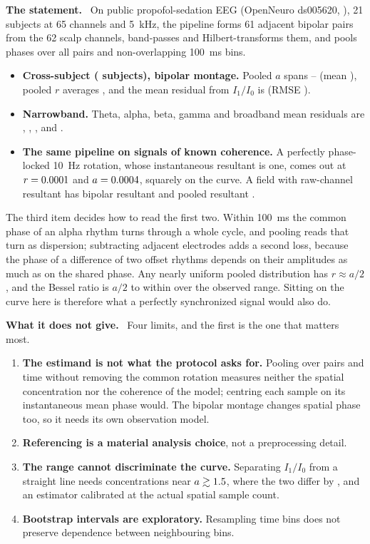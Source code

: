 \documentclass[11pt]{article}
\newcommand{\statement}{\par\smallskip\noindent\textbf{The statement.}\ }
\newcommand{\scope}{\par\smallskip\noindent\textbf{What it does not give.}\ }
\begin{document}
\statement
On public propofol-sedation EEG (OpenNeuro ds005620, \citealp{bajwa2025}),
21 subjects at 65 channels and 5~kHz, the pipeline forms 61 adjacent bipolar
pairs from the 62 scalp channels, band-passes and Hilbert-transforms them, and
pools phases over all pairs and non-overlapping 100~ms bins.

\begin{itemize}[leftmargin=*]
\item \textbf{Cross-subject (\eegCrossSubjectCount{} subjects), bipolar montage.}
Pooled $a$ spans \eegAMin--\eegAMax{} (mean \eegAMean), pooled $r$ averages
\eegRMean, and the mean residual from $I_1/I_0$ is \eegResidualMean{} (RMSE
\eegResidualRmse).
\item \textbf{Narrowband.} Theta, alpha, beta, gamma and broadband mean
residuals are \eegBandTheta, \eegBandAlpha, \eegBandBeta, \eegBandGamma{} and
\eegBandBroad.
\item \textbf{The same pipeline on signals of known coherence.} A perfectly
phase-locked 10~Hz rotation, whose instantaneous resultant is one, comes out at
$r=0.0001$ and $a=0.0004$, squarely on the
curve. A field with raw-channel resultant \eegCheckFieldRawR{} has bipolar
resultant \eegCheckFieldBipolarR{} and pooled resultant \eegCheckFieldPooledR.
\end{itemize}

\noindent
The third item decides how to read the first two. Within 100~ms the common
phase of an alpha rhythm turns through a whole cycle, and pooling reads that
turn as dispersion; subtracting adjacent electrodes adds a second loss, because
the phase of a difference of two offset rhythms depends on their amplitudes as
much as on the shared phase. Any nearly uniform pooled distribution has
$r\approx a/2$, and the Bessel ratio is $a/2$ to within
\collapseLinearDeviation{} over the observed range. Sitting on the curve here is
therefore what a perfectly synchronized signal would also do.

\scope
Four limits, and the first is the one that matters most.

\begin{enumerate}[leftmargin=*]
\item \textbf{The estimand is not what the protocol asks for.} Pooling over
pairs and time without removing the common rotation measures neither the
spatial concentration nor the coherence of the model; centring each sample on
its instantaneous mean phase would. The bipolar montage changes spatial phase
too, so it needs its own observation model.
\item \textbf{Referencing is a material analysis choice}, not a preprocessing
detail.
\item \textbf{The range cannot discriminate the curve.} Separating $I_1/I_0$
from a straight line needs concentrations near $a\gtrsim1.5$, where
the two differ by \collapseProbeSeparation, and an estimator calibrated at the
actual spatial sample count.
\item \textbf{Bootstrap intervals are exploratory.} Resampling time bins does
not preserve dependence between neighbouring bins.
\end{enumerate}
\end{document}
